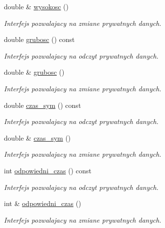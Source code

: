 \begin{DoxyCompactItemize}
double \& \hyperlink{class_zbiornik_af02cf0dac56cbb096a2e77e22f19afed}{wysokosc} ()
\begin{DoxyCompactList}\small\item\em Interfejs pozwalajacy na zmiane prywatnych danych. \end{DoxyCompactList}\item 
double \hyperlink{class_zbiornik_a34b0e660d8d6c4d1f45f06f5063b9788}{grubosc} () const 
\begin{DoxyCompactList}\small\item\em Interfejs pozwalajacy na odczyt prywatnych danych. \end{DoxyCompactList}\item 
double \& \hyperlink{class_zbiornik_a9a8f3d5b4fcc2ab626fb2a5602127810}{grubosc} ()
\begin{DoxyCompactList}\small\item\em Interfejs pozwalajacy na zmiane prywatnych danych. \end{DoxyCompactList}\item 
double \hyperlink{class_zbiornik_a94a4b32ae64aab4836be8c536358f612}{czas\-\_\-sym} () const 
\begin{DoxyCompactList}\small\item\em Interfejs pozwalajacy na odczyt prywatnych danych. \end{DoxyCompactList}\item 
double \& \hyperlink{class_zbiornik_abad8da28f2224b54c259c399bf68fc44}{czas\-\_\-sym} ()
\begin{DoxyCompactList}\small\item\em Interfejs pozwalajacy na zmiane prywatnych danych. \end{DoxyCompactList}\item 
int \hyperlink{class_zbiornik_ac0899810e0771b37ce815717d98190f7}{odpowiedni\-\_\-czas} () const 
\begin{DoxyCompactList}\small\item\em Interfejs pozwalajacy na odczyt prywatnych danych. \end{DoxyCompactList}\item 
int \& \hyperlink{class_zbiornik_afc80f37f2aaa84dd22dca5e4741f8495}{odpowiedni\-\_\-czas} ()
\begin{DoxyCompactList}\small\item\em Interfejs pozwalajacy na zmiane prywatnych danych. \end{DoxyCompactList}\end{DoxyCompactItemize}
